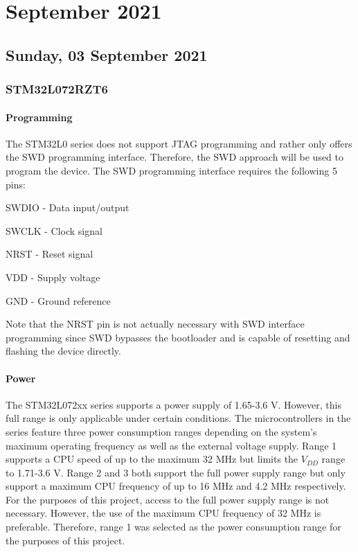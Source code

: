 \chapter[2021 September]{September 2021}

\section[2021/09/03]{Sunday, 03 September 2021}

\subsection{STM32L072RZT6}

\subsubsection{Programming}

The STM32L0 series does not support \ac{JTAG} programming and rather only offers the \ac{SWD} programming interface. Therefore, the \ac{SWD} approach will be used to program the device. The \ac{SWD} programming interface requires the following 5 pins:

\begin{compactitem}
	\item SWDIO - Data input/output
	\item SWCLK - Clock signal
	\item NRST - Reset signal
	\item VDD - Supply voltage
	\item GND - Ground reference
\end{compactitem}

Note that the NRST pin is not actually necessary with \ac{SWD} interface programming since \ac{SWD} bypasses the bootloader and is capable of resetting and flashing the device directly.

\subsubsection{Power}

The STM32L072xx series supports a power supply of 1.65-3.6 V. However, this full range is only applicable under certain conditions. The microcontrollers in the series feature three power consumption ranges depending on the system's maximum operating frequency as well as the external voltage supply. Range 1 supports a CPU speed of up to the maximum 32 MHz but limits the $V_{DD}$ range to 1.71-3.6 V. Range 2 and 3 both support the full power supply range but only support a maximum CPU frequency of up to 16 MHz and 4.2 MHz respectively. For the purposes of this project, access to the full power supply range is not necessary. However, the use of the maximum CPU frequency of 32 MHz is preferable. Therefore, range 1 was selected as the power consumption range for the purposes of this project.

